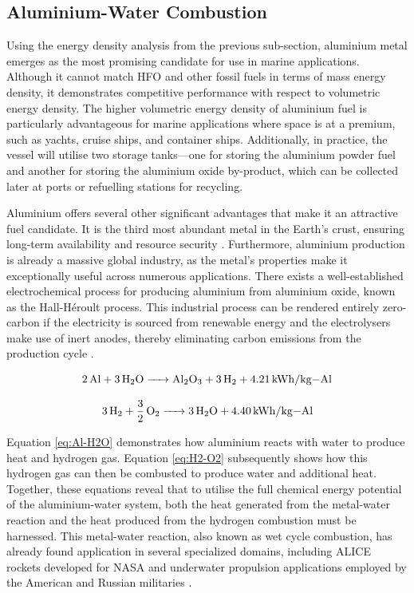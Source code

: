 \documentclass[12pt]{article}
\begin{document}
\break

\subsection{Aluminium-Water Combustion}

Using the energy density analysis from the previous sub-section, aluminium metal emerges as the most promising candidate for use in marine applications. Although it cannot match HFO and other fossil fuels in terms of mass energy density, it demonstrates competitive performance with respect to volumetric energy density. The higher volumetric energy density of aluminium fuel is particularly advantageous for marine applications where space is at a premium, such as yachts, cruise ships, and container ships. Additionally, in practice, the vessel will utilise two storage tanks—one for storing the aluminium powder fuel and another for storing the aluminium oxide by-product, which can be collected later at ports or refuelling stations for recycling.

Aluminium offers several other significant advantages that make it an attractive fuel candidate. It is the third most abundant metal in the Earth's crust, ensuring long-term availability and resource security \cite{Al-H20-economics, metal-hydrides-review}. Furthermore, aluminium production is already a massive global industry, as the metal's properties make it exceptionally useful across numerous applications. There exists a well-established electrochemical process for producing aluminium from aluminium oxide, known as the Hall-Héroult process. This industrial process can be rendered entirely zero-carbon if the electricity is sourced from renewable energy and the electrolysers make use of inert anodes, thereby eliminating carbon emissions from the production cycle \cite{aluminium-inert-anodes}.

\begin{equation}
	\label{eq:Al-H2O}
	\ce{2Al + 3H2O -> Al2O3 + 3H2 + 4.21 kWh/kg-Al}
\end{equation}

\begin{equation}
	\label{eq:H2-O2}
	\ce{3H2 + 3/2O2 -> 3H2O + 4.40 kWh/kg-Al}
\end{equation}

Equation \ref{eq:Al-H2O} demonstrates how aluminium reacts with water to produce heat and hydrogen gas. Equation \ref{eq:H2-O2} subsequently shows how this hydrogen gas can then be combusted to produce water and additional heat. Together, these equations reveal that to utilise the full chemical energy potential of the aluminium-water system, both the heat generated from the metal-water reaction and the heat produced from the hydrogen combustion must be harnessed. This metal-water reaction, also known as wet cycle combustion, has already found application in several specialized domains, including ALICE rockets developed for NASA \cite{alice-rockets} and underwater propulsion applications employed by the American and Russian militaries \cite{Al-H2O-UUV}.
\end{document}
